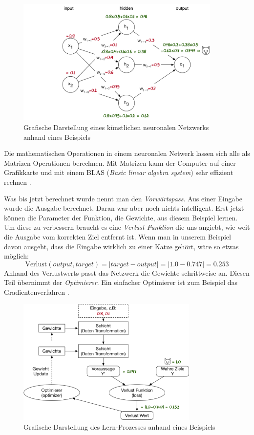 \begin{figure}[hbt]
	\centering
		\includegraphics[width=0.9\textwidth]{assets/neural_net.png}
	\caption{Grafische Darstellung eines künstlichen neuronalen Netzwerks anhand eines Beispiels}
	\label{img:neuralnet}
\end{figure}

Die mathematischen Operationen in einem neuronalen Netwerk lassen sich alle als Matrizen-Operationen berechnen. Mit Matrizen kann der Computer auf einer Grafikkarte und mit einem BLAS (\textit{Basic linear algebra system}) sehr effizient rechnen \parencite{neuronale_netze} .

Was bis jetzt berechnet wurde nennt man den \textit{Vorwärtspass}. Aus einer Eingabe wurde die Ausgabe berechnet. Daran war aber noch nichts intelligent. Erst jetzt können die Parameter der Funktion, die Gewichte, aus diesem Beispiel lernen. Um diese zu verbessern braucht es eine \textit{Verlust Funktion} die uns angiebt, wie weit die Ausgabe vom korrekten Ziel entfernt ist. Wenn man in unserem Beispiel davon ausgeht, dass die Eingabe wirklich zu einer Katze gehört, wäre so etwas möglich:
$$ \text{Verlust}(output, target) = |target-output| = |1.0-0.747| = 0.253$$
Anhand des Verlustwerts passt das Netzwerk die Gewichte schrittweise an. Diesen Teil übernimmt der  \textit{Optimierer}. Ein einfacher Optimierer ist zum Beispiel das Gradientenverfahren \parencite{gradient}.

\begin{figure}[hbt]
	\centering
		\includegraphics[width=0.8\textwidth]{assets/anatomy.png}
	\caption{Grafische Darstellung des Lern-Prozesses anhand eines Beispiels}
	\label{img:anatomy}
\end{figure}


